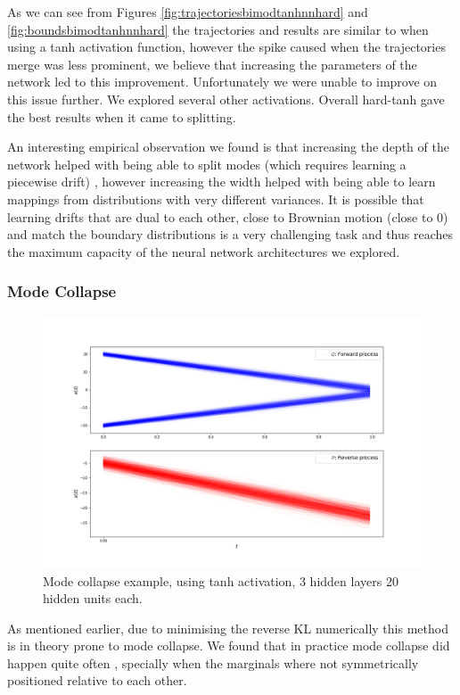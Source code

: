 \documentclass[a4paper,12pt,twoside,openright]{report}
\theoremstyle{definition}
\begin{document}
As we can see from Figures \ref{fig:trajectoriesbimodtanhnnhard} and \ref{fig:boundsbimodtanhnnhard} the trajectories and results are similar to when using a tanh activation function, however the spike caused when the trajectories merge was less prominent, we believe that increasing the parameters of the network led to this improvement. Unfortunately we were unable to improve on this issue further.  We explored several other activations. Overall hard-tanh gave the best results when it came to splitting.

An interesting empirical observation we found is that increasing the depth of the network helped with being able to split modes (which requires learning a piecewise drift) , however increasing the width helped with being  able to learn mappings from distributions with very different  variances. It is possible that learning drifts that are dual to each other, close to Brownian motion (close to 0) and match the boundary distributions is a very challenging task and thus reaches the maximum capacity of the neural network architectures we explored.
\subsubsection{Mode Collapse}
\begin{figure}[t]
    \centering
    \includegraphics[scale=0.4,trim={2.3cm 1cm 2.5cm 0}, clip]{images/Control/mode_colapse_final_relu_trajectories.png}
    \caption{ Mode collapse example, using tanh activation, 3 hidden layers 20 hidden units each.}
    \label{fig:trajectoriesmodecop}
\end{figure}
As mentioned earlier, due to minimising the reverse KL numerically this method is in theory prone to mode collapse. We found that in practice mode collapse did happen quite often , specially when the marginals where not symmetrically positioned relative to each other. 
\end{document}
